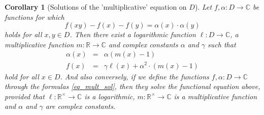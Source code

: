 \documentclass[a4paper,12pt]{article}
\theoremstyle{plain}
\newtheorem{cor}{Corollary}
\theoremstyle{definition}
\theoremstyle{remark}
\begin{document}
\begin{cor}[Solutions of the 'multiplicative' equation on $D$]\label{cor_multD}
 Let  $f, \alpha \colon D \to \mathbb{C}$ be functions for which 
 \begin{equation}\label{eq_mult}
  f(xy)-f(x)-f(y)= \alpha(x)\cdot \alpha(y)
 \end{equation}
 holds for all $x, y\in D$. Then there exist a logarithmic function $\ell \colon D \to \mathbb{C}$, a multiplicative function $m\colon \mathbb{R}\to \mathbb{C}$ and complex constants 
 $\alpha$ and $\gamma$ such that 
 \begin{equation}\label{eq_mult_sol}
 \begin{array}{rcl}
 \alpha(x)&=& \alpha (m(x)-1)\\
  f(x)&=& \gamma  \ell (x)+\alpha^{2}\cdot (m(x)-1)
  \end{array}
   \end{equation}
 hold for all $x\in D$. And also conversely, if we define the functions $f, \alpha \colon D\to \mathbb{C}$ through the formulas \eqref{eq_mult_sol}, then they solve the functional  equation above, provided that $\ell \colon \mathbb{R}^{\times}\to \mathbb{C}$ is a logarithmic, $m\colon \mathbb{R}^{\times}\to \mathbb{C}$ is a multiplicative function and $\alpha$ and $\gamma$ are complex constants.  
\end{cor}
\end{document}
